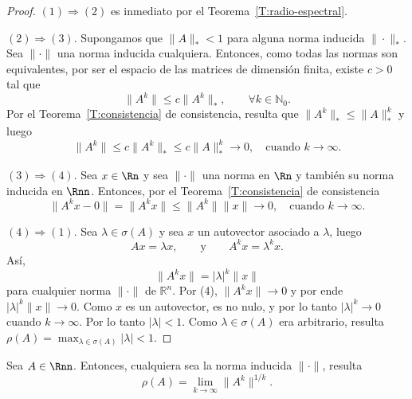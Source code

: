 \begin{proof}
  $(1) \Rightarrow (2)$ es inmediato por el Teorema~\ref{T:radio-espectral}.

  $(2) \Rightarrow (3)$. Supongamos que $\|A\|_* < 1$ para alguna norma inducida $\| \cdot \|_*$. Sea $\| \cdot \|$ una norma inducida cualquiera. Entonces, como todas las normas son equivalentes, por ser el espacio de las matrices de dimensión finita, existe $c > 0$ tal que
  \[
  \| A^k \| \le c \| A^k \|_*, \qquad \forall k \in \mathbb{N}_0.
  \]
  Por el Teorema~\ref{T:consistencia} de consistencia, resulta que $\|A^k \|_* \le \|A\|_*^k$ y luego
  \[
  \| A^k \| \le c \| A^k \|_* \le c \|A\|_*^k \to 0 , \quad\text{cuando }k\to\infty.
  \]

  $(3) \Rightarrow (4)$. Sea $x \in \Rn$ y sea $\| \cdot \|$ una norma en $\Rn$ y también su norma inducida en $\Rnn$. Entonces, por el Teorema~\ref{T:consistencia} de consistencia
  \[
  \| A^k x - 0\| = \| A^k x \| \le \| A^k \| \| x \|  \to 0 , \quad\text{cuando }k\to\infty.
  \]

  $(4) \Rightarrow (1)$. Sea $\lambda \in \sigma(A)$ y sea $x$ un autovector asociado a $\lambda$, luego
  \[
  Ax = \lambda x, \qquad \text{y}\qquad
  A^k x = \lambda^k x.
  \]
  Así,
  \[
  \| A^k x \| = |\lambda|^k \| x\|
  \]
  para cualquier norma $\| \cdot \| $ de $\mathbb{R}^n$. Por (4), $\| A^k x \| \to 0$ y por ende $|\lambda|^k \| x\| \to 0$. Como $x$ es un autovector, es no nulo, y por lo tanto $|\lambda|^k \to 0$ cuando $k\to\infty$. Por lo tanto $|\lambda| < 1$. Como $\lambda\in\sigma(A)$ era arbitrario, resulta $\rho(A) = \max_{\lambda \in \sigma(A)} |\lambda| < 1$.
\end{proof}


\begin{thm} Sea $A\in\Rnn$. Entonces, cualquiera sea la norma inducida $\| \cdot \|$, resulta
  \[
  \rho(A) = \lim_{k \to \infty} \| A^k \|^{1/k}.
  \]
\end{thm}

